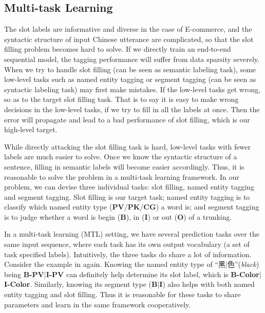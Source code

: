 \subsection{Multi-task Learning}
The slot labels are informative and diverse in the case of E-commerce,
and the syntactic structure of input Chinese utterance are complicated,
so that the slot filling problem becomes hard to solve.
If we directly train an end-to-end sequential model,
the tagging performance will suffer from data sparsity severely.
When we try to handle slot filling (can be seen as semantic labeling task),
some low-level tasks such as named entity tagging or segment tagging (can be seen as syntactic labeling task)
may first make mistakes.
If the low-level tasks get wrong, so as to the target slot filling task.
That is to say it is easy to make wrong decisions in the low-level tasks,
if we try to fill in all the labels at once.
Then the error will propagate and lead to a bad performance of slot filling, which is our high-level target.

While directly attacking the slot filling task is hard,
low-level tasks with fewer labels are much easier to solve.
Once we know the syntactic structure of a sentence,
filling in semantic labels will become easier accordingly.
Thus, it is reasonable to solve the problem in a multi-task learning 
framework.
In our problem, we can devise three individual tasks: slot filling, named entity tagging and segment tagging.
Slot filling is our target task;
named entity tagging is to classify which named entity type (\textbf{PV}/\textbf{PK}/\textbf{CG}) a word is;
and segment tagging is to judge 
whether a word is begin (\textbf{B}), in (\textbf{I}) or out (\textbf{O}) of a trunking.

In a multi-task learning (MTL) setting, 
we have several prediction tasks over the same input sequence,
where each task has its own output vocabulary (a set of task 
specified labels).
Intuitively, the three tasks do share a lot of information.
Consider the example in  again. 
Knowing the named entity type of ``黑$|$色''(\emph{black}) being 
\textbf{B-PV}$|$\textbf{I-PV}
can definitely help determine its slot label, 
which is \textbf{B-Color}$|$\textbf{I-Color}.
Similarly, knowing its segment type (\textbf{B}$|$\textbf{I}) 
also helps with both named entity tagging and slot filling.
Thus it is reasonable for these tasks to share parameters
and learn in the same framework cooperatively.

